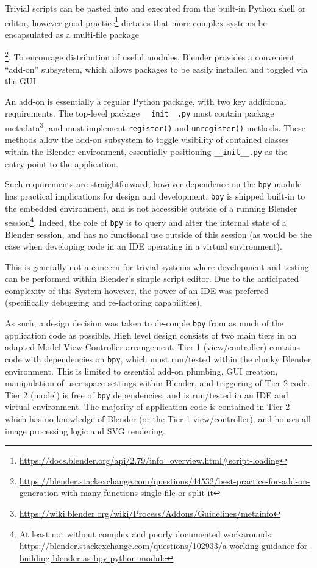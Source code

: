 Trivial scripts can be pasted into and executed from the built-in Python shell or editor, however good practice\footnote{\url{https://docs.blender.org/api/2.79/info_overview.html#script-loading}} dictates that more complex systems be encapsulated as a multi-file package{\footnote{\url{https://blender.stackexchange.com/questions/44532/best-practice-for-add-on-generation-with-many-functions-single-file-or-split-it}}.
To encourage distribution of useful modules, Blender provides a convenient ``add-on'' subsystem, which allows packages to be easily installed and toggled via the GUI.

An add-on is essentially a regular Python package, with two key additional requirements. The top-level package \texttt{\_\_init\_\_.py} must contain package metadata\footnote{\url{https://wiki.blender.org/wiki/Process/Addons/Guidelines/metainfo}}, and must implement \texttt{register()} and \texttt{unregister()} methods. 
These methods allow the add-on subsystem to toggle visibility of contained classes within the Blender environment, essentially positioning \texttt{\_\_init\_\_.py} as the entry-point to the application.

Such requirements are straightforward, however dependence on the \texttt{bpy} module has practical implications for design and development.
\texttt{bpy} is shipped built-in to the embedded environment, and is not accessible outside of a running Blender session\footnote{At least not without complex and poorly documented workarounds: \url{https://blender.stackexchange.com/questions/102933/a-working-guidance-for-building-blender-as-bpy-python-module}}.
Indeed, the role of \texttt{bpy} is to query and alter the internal state of a Blender session, and has no functional use outside of this session (as would be the case when developing code in an IDE operating in a virtual environment).

This is generally not a concern for trivial systems where development and testing can be performed within Blender's simple script editor.
Due to the anticipated complexity of this System however, the power of an IDE was preferred (specifically debugging and re-factoring capabilities).

As such, a design decision was taken to de-couple \texttt{bpy} from as much of the application code as possible.
High level design consists of two main tiers in an adapted Model-View-Controller arrangement. Tier 1 (view/controller) contains code with dependencies on \texttt{bpy}, which must run/tested within the clunky Blender environment. This is limited to essential add-on plumbing, GUI creation, manipulation of user-space settings within Blender, and triggering of Tier 2 code. Tier 2 (model) is free of \texttt{bpy} dependencies, and is run/tested in an IDE and virtual environment. The majority of application code is contained in Tier 2 which has no knowledge of Blender (or the Tier 1 view/controller), and houses all image processing logic and SVG rendering.

}
